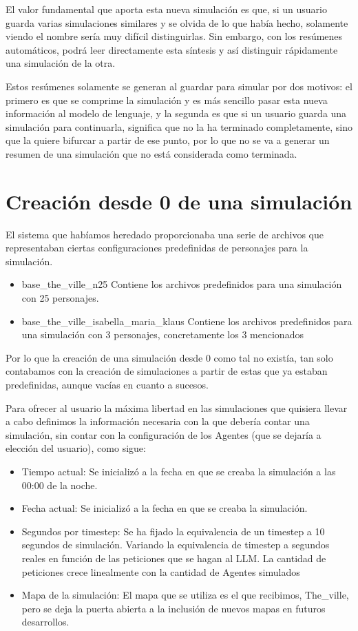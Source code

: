 El valor fundamental que aporta esta nueva simulación es que, si un usuario guarda varias simulaciones similares y se olvida de lo que había hecho, solamente viendo el nombre sería muy difícil distinguirlas. Sin embargo, con los resúmenes automáticos, podrá leer directamente esta síntesis y así distinguir rápidamente una simulación de la otra.

Estos resúmenes solamente se generan al guardar para simular por dos motivos: el primero es que se comprime la simulación y es más sencillo pasar esta nueva información al modelo de lenguaje, y la segunda es que si un usuario guarda una simulación para continuarla, significa que no la ha terminado completamente, sino que la quiere bifurcar a partir de ese punto, por lo que no se va a generar un resumen de una simulación que no está considerada como terminada.

\section{Creación desde 0 de una simulación}

El sistema que habíamos heredado proporcionaba una serie de archivos que representaban ciertas configuraciones predefinidas de personajes para la simulación.

\begin{itemize}
	\item{base\_the\_ville\_n25} Contiene los archivos predefinidos para una simulación con 25 personajes.
	\item{base\_the\_ville\_isabella\_maria\_klaus} Contiene los archivos predefinidos para una simulación con 3 personajes, concretamente los 3 mencionados
\end{itemize}

Por lo que la creación de una simulación desde 0 como tal no existía, tan solo contabamos con la creación de simulaciones a partir de estas que ya estaban predefinidas, aunque vacías en cuanto a sucesos.

Para ofrecer al usuario la máxima libertad en las simulaciones que quisiera llevar a cabo definimos la información necesaria con la que debería contar una simulación, sin contar con la configuración de los Agentes (que se dejaría a elección del usuario), como sigue:

\begin{itemize}
	\item{Tiempo actual}: Se inicializó a la fecha en que se creaba la simulación a las 00:00 de la noche.
	\item{Fecha actual}: Se inicializó a la fecha en que se creaba la simulación.
	\item{Segundos por timestep}: Se ha fijado la equivalencia de un timestep a 10 segundos de simulación. Variando la equivalencia de timestep a segundos reales en función de las peticiones que se hagan al LLM. La cantidad de peticiones crece linealmente con la cantidad de Agentes simulados
	\item{Mapa de la simulación}: El mapa que se utiliza es el que recibimos, The\_ville, pero se deja la puerta abierta a la inclusión de nuevos mapas en futuros desarrollos.
\end{itemize}

